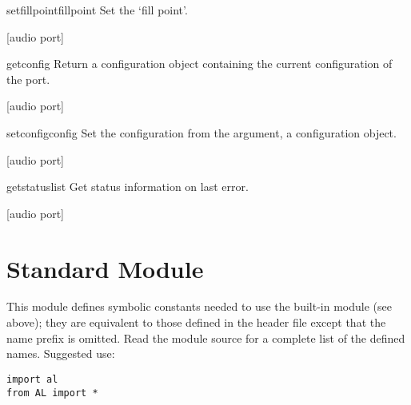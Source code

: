 \begin{methoddesc}{setfillpoint}{fillpoint}
Set the `fill point'.
\end{methoddesc}[audio port]

\begin{methoddesc}{getconfig}{}
Return a configuration object containing the current configuration of
the port.
\end{methoddesc}[audio port]

\begin{methoddesc}{setconfig}{config}
Set the configuration from the argument, a configuration object.
\end{methoddesc}[audio port]

\begin{methoddesc}{getstatus}{list}
Get status information on last error.
\end{methoddesc}[audio port]


\section{Standard Module }

This module defines symbolic constants needed to use the built-in
module  (see above); they are equivalent to those defined
in the \C{} header file  except that the name prefix
 is omitted.  Read the module source for a complete list of
the defined names.  Suggested use:

\begin{verbatim}
import al
from AL import *
\end{verbatim}
